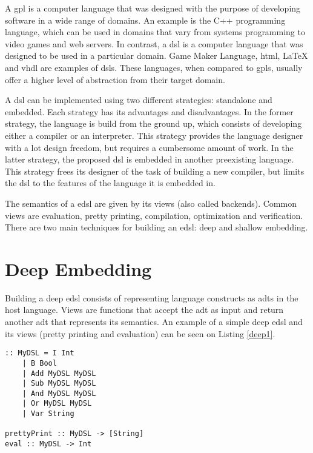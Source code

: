 A \ac{gpl} is a computer language that was designed with the purpose of developing software in a wide range of domains. An example is the C++ programming language, which can be used in domains that vary from systems programming to video games and web servers. In contrast, a \ac{dsl} is a computer language that was designed to be used in a particular domain. Game Maker Language, \acs{html}, LaTeX and \acs{vhdl} are examples of \acp{dsl}. These languages, when compared to \acp{gpl}, usually offer a higher level of abstraction from their target domain.

A \ac{dsl} can be implemented using two different strategies: standalone and embedded. Each strategy has its advantages and disadvantages. In the former strategy, the language is build from the ground up, which consists of developing either a compiler or an interpreter. This strategy provides the language designer with a lot design freedom, but requires a cumbersome amount of work. In the latter strategy, the proposed \ac{dsl} is embedded in another preexisting language. This strategy frees its designer of the task of building a new compiler, but limits the \ac{dsl} to the features of the language it is embedded in.

The semantics of a \ac{edsl} are given by its views (also called backends). Common views are evaluation, pretty printing, compilation, optimization and verification. There are two main techniques for building an \ac{edsl}: deep and shallow embedding.

\section{Deep Embedding}

Building a deep \ac{edsl} consists of representing language constructs as \acp{adt} in the host language. Views are functions that accept the \ac{adt} as input and return another \ac{adt} that represents its semantics. An example of a simple deep \ac{edsl} and its views (pretty printing and evaluation) can be seen on Listing \ref{deep1}.


\begin{lstlisting}[caption=A simple deep \ac{edsl} and its views,captionpos=b,label=deep1]
:: MyDSL = I Int
    | B Bool
    | Add MyDSL MyDSL
    | Sub MyDSL MyDSL
    | And MyDSL MyDSL
    | Or MyDSL MyDSL
    | Var String
    
prettyPrint :: MyDSL -> [String]
eval :: MyDSL -> Int
\end{lstlisting}

